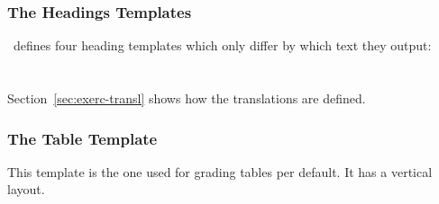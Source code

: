 \documentclass{xsim-manual}
\begin{document}
\subsubsection{The Headings Templates}\label{sec:headings-templates}
\xsim\ defines four heading templates which only differ by which text they
output:
\begin{sourcecode}
    {\section*{}}
    {\section*{}}
    {\section*{}}
    {\section*{}}
\end{sourcecode}
Section~\vref{sec:exerc-transl} shows how the translations are defined.

\subsubsection{The  Table Template}\label{sec:table-templ-default}
This template is the one used for grading tables per default.  It has a
vertical layout.
\end{document}
